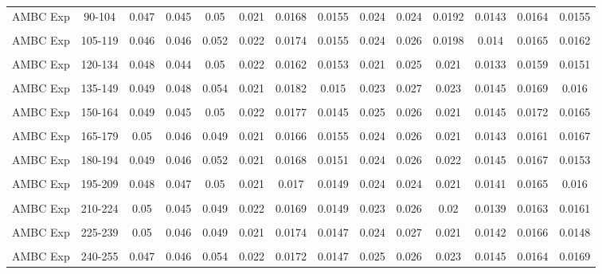 \begin{table}
\begin{center}
\begin{tabular}{c|ccccccccccccc}
\ac{AMBC} Exp & 90-104   & 0.047  & 0.045  & 0.05  & 0.021  & 0.0168  & 0.0155  & 0.024  & 0.024  & 0.0192  & 0.0143  & 0.0164  & 0.0155  \\
\\
\ac{AMBC} Exp & 105-119   & 0.046  & 0.046  & 0.052  & 0.022  & 0.0174  & 0.0155  & 0.024  & 0.026  & 0.0198  & 0.014  & 0.0165  & 0.0162  \\
\\
\ac{AMBC} Exp & 120-134  & 0.048  & 0.044  & 0.05  & 0.022  & 0.0162  & 0.0153  & 0.021  & 0.025  & 0.021  & 0.0133  & 0.0159  & 0.0151  \\
\\
\ac{AMBC} Exp & 135-149   & 0.049  & 0.048  & 0.054  & 0.021  & 0.0182  & 0.015  & 0.023  & 0.027  & 0.023  & 0.0145  & 0.0169  & 0.016  \\
\\
\ac{AMBC} Exp & 150-164   & 0.049  & 0.045  & 0.05  & 0.022  & 0.0177  & 0.0145  & 0.025  & 0.026  & 0.021  & 0.0145  & 0.0172  & 0.0165  \\
\\
\ac{AMBC} Exp & 165-179   & 0.05  & 0.046  & 0.049  & 0.021  & 0.0166  & 0.0155  & 0.024  & 0.026  & 0.021  & 0.0143  & 0.0161  & 0.0167  \\
\\
\ac{AMBC} Exp & 180-194   & 0.049  & 0.046  & 0.052  & 0.021  & 0.0168  & 0.0151  & 0.024  & 0.026  & 0.022  & 0.0145  & 0.0167  & 0.0153  \\
\\
\ac{AMBC} Exp & 195-209   & 0.048  & 0.047  & 0.05  & 0.021  & 0.017  & 0.0149  & 0.024  & 0.024  & 0.021  & 0.0141  & 0.0165  & 0.016  \\
\\
\ac{AMBC} Exp & 210-224   & 0.05  & 0.045  & 0.049  & 0.022  & 0.0169  & 0.0149  & 0.023  & 0.026  & 0.02  & 0.0139  & 0.0163  & 0.0161  \\
\\
\ac{AMBC} Exp & 225-239   & 0.05  & 0.046  & 0.049  & 0.021  & 0.0174  & 0.0147  & 0.024  & 0.027  & 0.021  & 0.0142  & 0.0166  & 0.0148  \\
\\
\ac{AMBC} Exp & 240-255   & 0.047  & 0.046  & 0.054  & 0.022  & 0.0172  & 0.0147  & 0.025  & 0.026  & 0.023  & 0.0145  & 0.0164  & 0.0169  \\
\end{tabular}
\end{center}
\label{chUV_AMBC.tb.trajTrackMAE}
\end{table}



